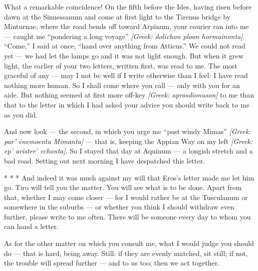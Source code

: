 

 What a remarkable coincidence! On the fifth before the Ides, having risen before dawn at the Sinuessanum and come at first light to the Tirenus bridge by Minturnae, where the road bends off toward Arpinum, your courier ran into me --- caught me ``pondering a long voyage'' \textit{[Greek: dolichon ploon hormainonta]}. ``Come,'' I said at once, ``hand over anything from Atticus.'' We could not read yet --- we had let the lamps go and it was not light enough. But when it grew light, the earlier of your two letters, written first, was read to me. The most graceful of any --- may I not be well if I write otherwise than I feel: I have read nothing more human. So I shall come where you call --- only with you for an aide. But nothing seemed at first more off-key \textit{[Greek: aprosdionuson]} to me than that to the letter in which I had asked your advice you should write back to me as you did.

 And now look --- the second, in which you urge me ``past windy Mimas'' \textit{[Greek: par' ēnemoenta Mimanta]} --- that is, keeping the Appian Way on my left \textit{[Greek: ep' arister' echonta]}. So I stayed that day at Aquinum --- a longish stretch and a bad road. Setting out next morning I have despatched this letter.

 * * * And indeed it was much against my will that Eros's letter made me let him go. Tiro will tell you the matter. You will see what is to be done. Apart from that, whether I may come closer --- for I would rather be at the Tusculanum or somewhere in the suburbs --- or whether you think I should withdraw even further, please write to me often. There will be someone every day to whom you can hand a letter.

 As for the other matter on which you consult me, what I would judge you should do --- that is hard, being away. Still: if they are evenly matched, sit still; if not, the trouble will spread further --- and to us too; then we act together.
